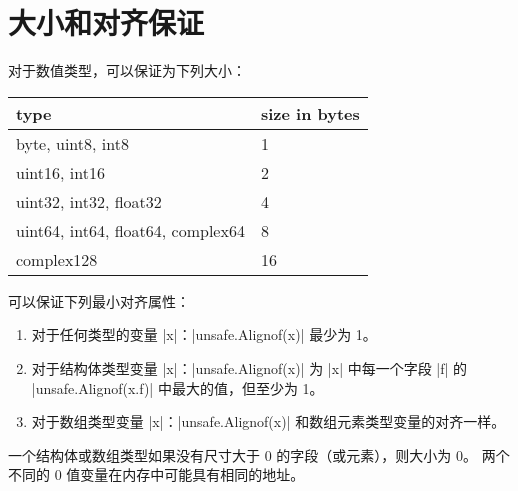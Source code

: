 \section{大小和对齐保证}
对于数值类型，可以保证为下列大小：
\begin{table}[H]
\centering
\begin{tabular}{ll}
type                           &      size in bytes  \\ \hline

byte, uint8, int8            &         1 \\
uint16, int16                &         2  \\
uint32, int32, float32            &    4 \\
uint64, int64, float64, complex64   &  8 \\
complex128                    &       16 \\
\end{tabular}
\end{table}

可以保证下列最小对齐属性：
\begin{enumerate}
\item 对于任何类型的变量 \code|x|：\code|unsafe.Alignof(x)| 最少为 1。
\item 对于结构体类型变量 \code|x|：\code|unsafe.Alignof(x)| 为 \code|x| 中每一个字段 \code|f| 的 \code|unsafe.Alignof(x.f)| 中最大的值，但至少为 1。
\item 对于数组类型变量 \code|x|：\code|unsafe.Alignof(x)| 和数组元素类型变量的对齐一样。
\end{enumerate}

一个结构体或数组类型如果没有尺寸大于 0 的字段（或元素），则大小为 0。
两个不同的 0 值变量在内存中可能具有相同的地址。